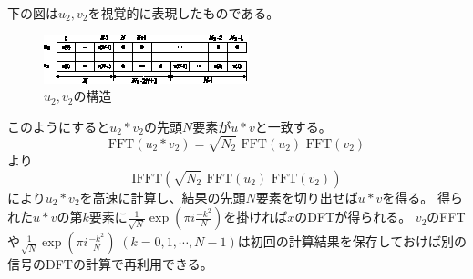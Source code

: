 				下の図は$u_2,v_2$を視覚的に表現したものである。
				\begin{figure}[H]
					\centering
					\includegraphics[keepaspectratio, scale=4]
					{parts/FourierAnalysis/imgs/FFT/arbitraryLengthFFT_to_powerOf2_FFT/u2,v2.eps}
					\caption{$u_2,v_2$の構造}
				\end{figure}
				このようにすると$u_2*v_2$の先頭$N$要素が$u*v$と一致する。
				\[ \text{FFT}(u_2*v_2) = \sqrt{N_2}\text{ FFT}(u_2) \text{ FFT}(v_2) \]
				より
				\[ \text{IFFT}(\sqrt{N_2}\text{ FFT}(u_2) \text{ FFT}(v_2)) \]
				により$u_2*v_2$を高速に計算し、結果の先頭$N$要素を切り出せば$u*v$を得る。
				得られた$u*v$の第$k$要素に$\frac{1}{\sqrt{N}} \exp \left(\pi i\frac{-k^2}{N}\right)$を掛ければ$x$のDFTが得られる。
				$v_2$のFFTや$\frac{1}{\sqrt{N}} \exp \left(\pi i\frac{-k^2}{N}\right) \;(k=0,1,\cdots,N-1)$は初回の計算結果を保存しておけば別の信号のDFTの計算で再利用できる。
